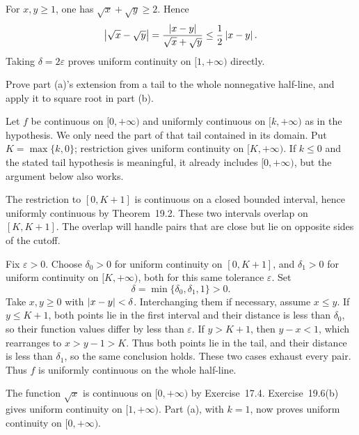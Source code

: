 For $x,y\ge1$, one has $\sqrt x+\sqrt y\ge2$. Hence
\[
 \left|\sqrt x-\sqrt y\right|
 =\frac{\left|x-y\right|}{\sqrt x+\sqrt y}\le\frac12\left|x-y\right|.
\]
Taking $\delta=2\varepsilon$ proves uniform continuity on
$[1,+\infty)$ directly.

\goal Prove part (a)'s extension from a tail to the whole
nonnegative half-line, and apply it to square root in part (b).

Let $f$ be continuous on $[0,+\infty)$ and uniformly continuous
on $[k,+\infty)$ as in the hypothesis. We only need the part
of that tail contained in its domain. Put $K=\max\{k,0\}$;
restriction gives uniform continuity on $[K,+\infty)$.
If $k\le0$ and the stated tail hypothesis is meaningful, it
already includes $[0,+\infty)$, but the argument below also works.

The restriction to $[0,K+1]$ is continuous on a closed bounded
interval, hence uniformly continuous by Theorem~19.2. These two
intervals overlap on $[K,K+1]$. The overlap will handle pairs
that are close but lie on opposite sides of the cutoff.

Fix $\varepsilon>0$. Choose $\delta_0>0$ for uniform continuity
on $[0,K+1]$, and $\delta_1>0$ for uniform continuity on
$[K,+\infty)$, both for this same tolerance $\varepsilon$.
Set
\[
 \delta=\min\{\delta_0,\delta_1,1\}>0.
\]
Take $x,y\ge0$ with $\left|x-y\right|<\delta$. Interchanging them
if necessary, assume $x\le y$.
If $y\le K+1$, both points lie in the first interval and
their distance is less than $\delta_0$, so their function values
differ by less than $\varepsilon$.
If $y>K+1$, then $y-x<1$, which rearranges to
$x>y-1>K$. Thus both points lie in the tail, and their distance
is less than $\delta_1$, so the same conclusion holds.
These two cases exhaust every pair. Thus $f$ is uniformly
continuous on the whole half-line.

The function $\sqrt x$ is continuous on $[0,+\infty)$ by
Exercise~17.4. Exercise~19.6(b) gives uniform continuity on
$[1,+\infty)$. Part (a), with $k=1$, now proves uniform
continuity on $[0,+\infty)$.

